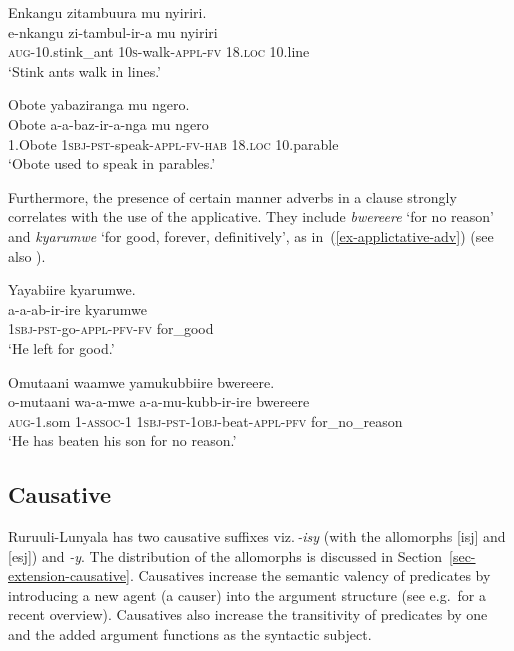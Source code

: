 \ea \label{ex-applictative-manner}
\begin{xlist}
	\ex \label{ex-applictative-manner1}
	\glll  Enkangu zitambuura mu nyiriri.\\
	e-nkangu zi-tambul-ir-a mu nyiriri\\
		\textsc{aug}-10.stink\_ant \textsc{10s}-walk-\textsc{appl}-\textsc{fv} 18.\textsc{loc} 10.line\\
	\glt ‘Stink ants walk in lines.’	

	\ex \label{ex-applictative-manner2}
	\glll Obote yabaziranga mu ngero.\\
	  Obote		a-a-baz-ir-a-nga mu ngero\\
		1.Obote \textsc{1sbj}-\textsc{pst}-speak-\textsc{appl}-\textsc{fv}-\textsc{hab} 18.\textsc{loc} 10.parable\\
	\glt ‘Obote used to speak in parables.’	
\end{xlist}
\z

\noindent Furthermore, the presence of certain manner adverbs in a clause strongly correlates  with the use of the applicative.
They include \emph{bwe\-reere} `for no reason' and \emph{kyarumwe} `for good, forever, definitively', as in~(\ref{ex-applictative-adv}) (see also \citealt{Atuhairwe2019Applicative}).

\ea \label{ex-applictative-adv}
\begin{xlist}
	\ex \label{ex-applictative-adv1}
	\glll 	Yayabiire kyarumwe.\\
		  a-a-ab-ir-ire kyarumwe\\
		\textsc{1sbj}-\textsc{pst}-go-\textsc{appl}-\textsc{pfv}-\textsc{fv} for\_good\\
	\glt ‘He left for good.’	

	\ex \label{ex-applictative-adv2}
	\glll Omutaani waamwe yamukubbiire bwereere.\\
	  o-mutaani wa-a-mwe a-a-mu-kubb-ir-ire bwereere\\
		\textsc{aug}-1.som 1-\textsc{assoc}-1 \textsc{1sbj}-\textsc{pst}-\textsc{1obj}-beat-\textsc{appl}-\textsc{pfv} for\_no\_reason\\
	\glt ‘He has beaten his son for no reason.’	
\end{xlist}
\z


\subsection{Causative}\label{sec-causative}

Ruruuli-Lunyala has two causative suffixes viz.\,\emph{-isy} (with the allomorphs [isj] and [esj]) and \emph{-y}. 
The distribution of the allomorphs is discussed in Section~\ref{sec-extension-causative}. 
Causatives increase the semantic valency of predicates by introducing a new agent (a causer) into the argument structure (see e.g.\,\citealt[15]{Zunigaetal2019Grammatical} for a recent overview). 
Causatives also increase the transitivity of predicates by one and the added argument functions as the syntactic subject. 


